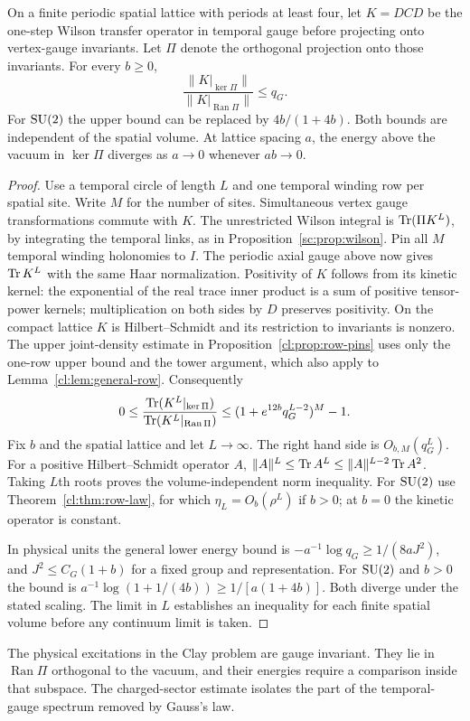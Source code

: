 \begin{theorem}
\label{cl:thm:charged-gap}
On a finite periodic spatial lattice with periods at least four, let
$K=DCD$ be the one-step Wilson transfer operator in temporal gauge
before projecting onto vertex-gauge invariants. Let $\Pi$ denote the
orthogonal projection onto those invariants. For every $b\ge0$,
\[
 \frac{\|K|_{\ker\Pi}\|}{\|K|_{\operatorname{Ran}\Pi}\|}\le q_G .
\]
For $\mathrm{SU}(2)$ the upper bound can be replaced by $4b/(1+4b)$. Both
bounds are independent of the spatial volume. At lattice spacing $a$,
the energy above the vacuum in $\ker\Pi$ diverges as $a\to0$ whenever
$ab\to0$.
\end{theorem}
\begin{proof}
Use a temporal circle of length $L$ and one temporal winding row per
spatial site. Write $M$ for the number of sites. Simultaneous vertex
gauge transformations commute with $K$. The unrestricted Wilson
integral is $\operatorname{Tr}(\Pi K^L)$, by integrating the temporal links,
as in Proposition~\ref{sc:prop:wilson}. Pin all $M$ temporal winding
holonomies to $I$. The periodic axial gauge above now gives $\operatorname{Tr} K^L$
with the same Haar normalization. Positivity of $K$ follows from its
kinetic kernel: the exponential of the real trace inner product is a
sum of positive tensor-power kernels; multiplication on both sides
by $D$ preserves positivity. On the compact lattice $K$ is
Hilbert--Schmidt and its restriction to invariants is nonzero.
The upper joint-density estimate in Proposition~\ref{cl:prop:row-pins}
uses only the one-row upper bound and the tower argument, which also
apply to Lemma~\ref{cl:lem:general-row}. Consequently
\[
 0\le\frac{\operatorname{Tr}(K^L|_{\ker\Pi})}{\operatorname{Tr}(K^L|_{\operatorname{Ran}\Pi})}
 \le(1+e^{12b}q_G^{L-2})^M-1 .
\]
Fix $b$ and the spatial lattice and let $L\to\infty$. The right hand
side is $O_{b,M}(q_G^L)$. For a positive Hilbert--Schmidt operator
$A$, $\|A\|^L\le\operatorname{Tr} A^L\le\|A\|^{L-2}\operatorname{Tr} A^2$. Taking $L$th roots
proves the volume-independent norm inequality. For $\mathrm{SU}(2)$ use
Theorem~\ref{cl:thm:row-law}, for which $\eta_L=O_b(\rho^L)$ if
$b>0$; at $b=0$ the kinetic operator is constant.

In physical units the general lower energy bound is
$-a^{-1}\log q_G\ge1/(8aJ^2)$, and $J^2\le C_G(1+b)$ for a fixed
group and representation. For $\mathrm{SU}(2)$ and $b>0$ the bound is
$a^{-1}\log(1+1/(4b))\ge1/[a(1+4b)]$. Both diverge under the stated
scaling. The limit in $L$ establishes an inequality for each finite
spatial volume before any continuum limit is taken.
\end{proof}
The physical excitations in the Clay problem are gauge invariant.
They lie in $\operatorname{Ran}\Pi$ orthogonal to the vacuum, and their
energies require a comparison inside that subspace. The charged-sector
estimate isolates the part of the temporal-gauge spectrum removed by
Gauss's law.

